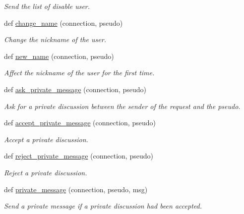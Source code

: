 \begin{DoxyCompactItemize}
\begin{DoxyCompactList}\small\item\em Send the list of disable user. \end{DoxyCompactList}\item 
def \hyperlink{namespaceserveur_1_1_server_a3b2565e14f3411c33c78a87b14d5c7aa}{change\+\_\+name} (connection, pseudo)
\begin{DoxyCompactList}\small\item\em Change the nickname of the user. \end{DoxyCompactList}\item 
def \hyperlink{namespaceserveur_1_1_server_af2287f3dd72634208a5834f16ab4164e}{new\+\_\+name} (connection, pseudo)
\begin{DoxyCompactList}\small\item\em Affect the nickname of the user for the first time. \end{DoxyCompactList}\item 
def \hyperlink{namespaceserveur_1_1_server_a7627a95511d9f92f85e31acb3e5cf37d}{ask\+\_\+private\+\_\+message} (connection, pseudo)
\begin{DoxyCompactList}\small\item\em Ask for a private discussion between the sender of the request and the pseudo. \end{DoxyCompactList}\item 
def \hyperlink{namespaceserveur_1_1_server_a4b08076d42c840ea98b62ac1193d1be0}{accept\+\_\+private\+\_\+message} (connection, pseudo)
\begin{DoxyCompactList}\small\item\em Accept a private discussion. \end{DoxyCompactList}\item 
def \hyperlink{namespaceserveur_1_1_server_a66de962a82a1e46a2ab327905acefc69}{reject\+\_\+private\+\_\+message} (connection, pseudo)
\begin{DoxyCompactList}\small\item\em Reject a private discussion. \end{DoxyCompactList}\item 
def \hyperlink{namespaceserveur_1_1_server_ad4678b89ffd724367bd5c934b6147181}{private\+\_\+message} (connection, pseudo, msg)
\begin{DoxyCompactList}\small\item\em Send a private message if a private discussion had been accepted. \end{DoxyCompactList}\item 

\end{DoxyCompactItemize}
